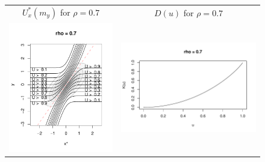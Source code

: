\documentclass[twoside,11pt]{article}
\newenvironment{myfont}{\fontfamily{phv}\selectfont}{\par}
\begin{document}
\begin{figure}[h]
\centering
\begin{tabular}{cc}
\begin{myfont}$U_x^*(m_y)$ for $\rho=0.7$\end{myfont}
& 
\begin{myfont}$D(u)$ for $\rho = 0.7$\end{myfont}\\
\includegraphics[scale = 0.6, clip = true, trim = 0.1in 0 0 0.8in]{illus_ufunc_0_7.pdf} &
\includegraphics[scale = 0.65, clip = true, trim = 0.22in -0.3in 0 0.5in]{illus_kfunc_0_7.pdf}
\end{tabular}


\end{figure}
\end{document}
